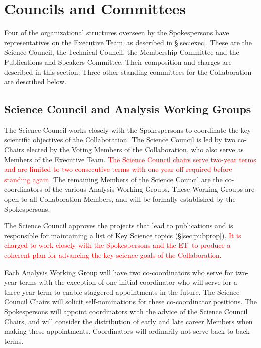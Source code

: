 \documentclass[12pt]{article}
\newcommand{\exec}{{Executive Team}}
\newcommand{\shorte}{{ET}}  %
\begin{document}
\section{Councils and Committees}
\label{sec:councils}
Four of the organizational structures overseen by the Spokespersons have representatives on the \exec\ as described in 
\S\ref{sec:exec}.  These are the Science Council, the Technical Council, the Membership Committee and the Publications and Speakers Committee.  Their composition and charges are described in this section.  Three other standing committees for the Collaboration %
are described below.  

\subsection{Science Council and Analysis Working Groups}
\label{sec:SC}

The Science Council works closely with the Spokespersons to coordinate the key scientific objectives of the Collaboration.  The Science Council is led by two co-Chairs elected by the Voting Members of the Collaboration, who also serve as Members of the \exec.   \textcolor{red}{The Science Council chairs serve two-year terms and are limited to two consecutive terms with one year off required before standing again.}
The remaining Members of the Science Council are the co-coordinators of the various Analysis Working Groups. These Working Groups are open to all Collaboration Members, and will be formally established by the Spokespersons.  

The Science Council approves the projects that lead to publications and is responsible for maintaining a list of Key Science topics  (\S\ref{sec:pubprop}). \textcolor{red}{It is charged to work closely with the Spokespersons and the \shorte\ to produce a coherent plan for advancing the key science goals of the Collaboration.} 

Each Analysis Working Group will have two co-coordinators who  serve for two-year terms with the exception of one initial coordinator who will serve for a three-year term to enable staggered appointments in the future.  The Science Council Chairs will solicit self-nominations for these co-coordinator positions. The Spokespersons will appoint coordinators with the advice of the Science Council Chairs, and will consider the distribution of early and late career Members when making these appointments. Coordinators will ordinarily not serve back-to-back terms.
\end{document}
